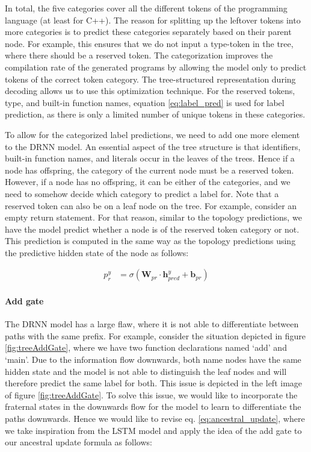 In total, the five categories cover all the different tokens of the programming language (at least for C++). The reason for splitting up the leftover tokens into more categories is to predict these categories separately based on their parent node. For example, this ensures that we do not input a type-token in the tree, where there should be a reserved token. The categorization improves the compilation rate of the generated programs by allowing the model only to predict tokens of the correct token category. The tree-structured representation during decoding allows us to use this optimization technique. For the reserved tokens, type, and built-in function names, equation \ref{eq:label_pred} is used for label prediction, as there is only a limited number of unique tokens in these categories. 



To allow for the categorized label predictions, we need to add one more element to the DRNN model. 
An essential aspect of the tree structure is that identifiers, built-in function names, and literals occur in the leaves of the trees. 
Hence if a node has offspring, the category of the current node must be a reserved token. 
However, if a node has no offspring, it can be either of the categories, and we need to somehow decide which category to predict a label for. Note that a reserved token can also be on a leaf node on the tree. For example, consider an empty return statement. For that reason, similar to the topology predictions, we have the model predict whether a node is of the reserved token category or not. This prediction  is computed in the same way as the topology predictions using the predictive hidden state of the node as follows: 

\begin{align}
    p_r^y &= \sigma(\mathbf{W}_{pr} \cdot \mathbf{h}_{pred}^y + \mathbf{b}_{pr}) \label{eq:res_pred}
\end{align}



\paragraph{Add gate} The DRNN model has a large flaw, where it is not able to differentiate between paths with the same prefix. For example, consider the situation depicted in figure \ref{fig:treeAddGate}, where we have two function declarations named `add' and `main'. Due to the information flow downwards, both name nodes have the same hidden state and the model is not able to distinguish the leaf nodes and will therefore predict the same label for both. This issue is depicted in the left image of figure \ref{fig:treeAddGate}. To solve this issue, we would like to incorporate the fraternal states in the downwards flow for the model to learn to differentiate the paths downwards. Hence we would like to revise eq. \ref{eq:ancestral_update}, where we take inspiration from the LSTM model and apply the idea of the add gate to our ancestral update formula as follows:

